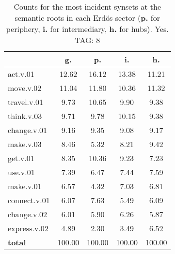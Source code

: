 \begin{table}[h!]
\begin{center}
\begin{tabular}{| l || c | c | c | c |}\hline
 & {\bf g.} & {\bf p.} & {\bf i.} & {\bf h.} \\\hline\hline
act.v.01 & 12.62  & 16.12  & 13.38  & 11.21 \\\hline
move.v.02 & 11.04  & 11.80  & 10.36  & 11.32 \\\hline
travel.v.01 & 9.73  & 10.65  & 9.90  & 9.38 \\\hline
think.v.03 & 9.71  & 9.78  & 10.15  & 9.38 \\\hline
change.v.01 & 9.16  & 9.35  & 9.08  & 9.17 \\\hline
make.v.03 & 8.46  & 5.32  & 8.21  & 9.42 \\\hline
get.v.01 & 8.35  & 10.36  & 9.23  & 7.23 \\\hline
use.v.01 & 7.39  & 6.47  & 7.44  & 7.59 \\\hline
make.v.01 & 6.57  & 4.32  & 7.03  & 6.81 \\\hline
connect.v.01 & 6.07  & 7.63  & 5.49  & 6.09 \\\hline
change.v.02 & 6.01  & 5.90  & 6.26  & 5.87 \\\hline
express.v.02 & 4.89  & 2.30  & 3.49  & 6.52 \\\hline\hline
{{\bf total}} & 100.00  & 100.00  & 100.00  & 100.00 \\\hline
\end{tabular}
\caption{Counts for the most incident synsets at the semantic roots in each Erd\"os sector ({\bf p.} for periphery, {\bf i.} for intermediary, {\bf h.} for hubs). Yes. TAG: 8}
\end{center}
\end{table}